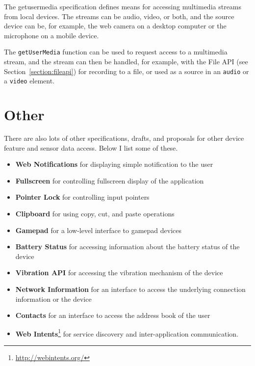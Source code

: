 The getusermedia specification \cite{getusermedia} defines means for
accessing multimedia streams from local devices. The streams can be
audio, video, or both, and the source device can be, for example, the
web camera on a desktop computer or the microphone on a mobile device.

The \texttt{getUserMedia} function can be used to request access to a
multimedia stream, and the stream can then be handled, for example,
with the File API (see Section~\ref{section:fileapi}) for recording to
a file, or used as a source in an \texttt{audio} or a \texttt{video}
element.

\section{Other}

There are also lots of other specifications, drafts, and proposals for
other device feature and sensor data access. Below I list some of
these.

\begin{itemize}

\item \textbf{Web Notifications} \cite{WebNotifications} for
  displaying simple notification to the user

\item \textbf{Fullscreen} \cite{Fullscreen} for controlling fullscreen
  display of the application

\item \textbf{Pointer Lock} \cite{PointerLock} for controlling input
  pointers

\item \textbf{Clipboard} \cite{ClipboardAPI} for using copy, cut, and
  paste operations

\item \textbf{Gamepad} \cite{Gamepad} for a low-level interface to
  gamepad devices

\item \textbf{Battery Status} \cite{BatteryStatusAPI} for accessing
  information about the battery status of the device

\item \textbf{Vibration API} \cite{VibrationAPI} for accessing the
  vibration mechanism of the device

\item \textbf{Network Information} \cite{NetworkInformationAPI} for an
  interface to access the underlying connection information or the
  device

\item \textbf{Contacts} \cite{ContactsAPI} for an interface to access
  the address book of the user

\item \textbf{Web Intents}\footnote{\url{http://webintents.org/}} for
  service discovery and inter-application communication.

\end{itemize}

